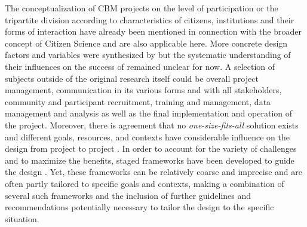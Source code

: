 The conceptualization of CBM projects on the level of participation or the tripartite division according to characteristics of citizens, institutions and their forms of interaction have already been mentioned in connection with the broader concept of Citizen Science and are also applicable here. More concrete design factors and variables were synthesized by \autocite{kirschkeCitizenScienceProjects2022} but the systematic understanding of their influences on the success of remained unclear for now. A selection of subjects outside of the original research itself could be overall project management, communication in its various forms and with all stakeholders, community and participant recruitment, training and management, data management and analysis as well as the final implementation and operation of the project. Moreover, there is agreement that no \textit{one-size-fits-all} solution exists and different goals, resources, and contexts have considerable influence on the design from project to project \autocite{fraislCitizenScienceEnvironmental2022}. In order to account for the variety of challenges and to maximize the benefits, staged frameworks have been developed to guide the design \autocite{citizenscience.govBasicStepsYour, fraislCitizenScienceEnvironmental2022,garciaFindingWhatYou2021,minkmanCitizenScienceWater2015}. Yet, these frameworks can be relatively coarse and imprecise and are often partly tailored to specific goals and contexts, making a combination of several such frameworks and the inclusion of further guidelines and recommendations potentially necessary to tailor the design to the specific situation. 

